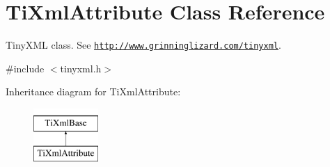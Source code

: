 \hypertarget{class_ti_xml_attribute}{}\section{Ti\+Xml\+Attribute Class Reference}
\label{class_ti_xml_attribute}


Tiny\+X\+ML class. See \href{http://www.grinninglizard.com/tinyxml}{\tt http\+://www.\+grinninglizard.\+com/tinyxml}.  




{\ttfamily \#include $<$tinyxml.\+h$>$}

Inheritance diagram for Ti\+Xml\+Attribute\+:\begin{figure}[H]
\begin{center}
\leavevmode
\includegraphics[height=2.000000cm]{class_ti_xml_attribute}
\end{center}
\end{figure}
